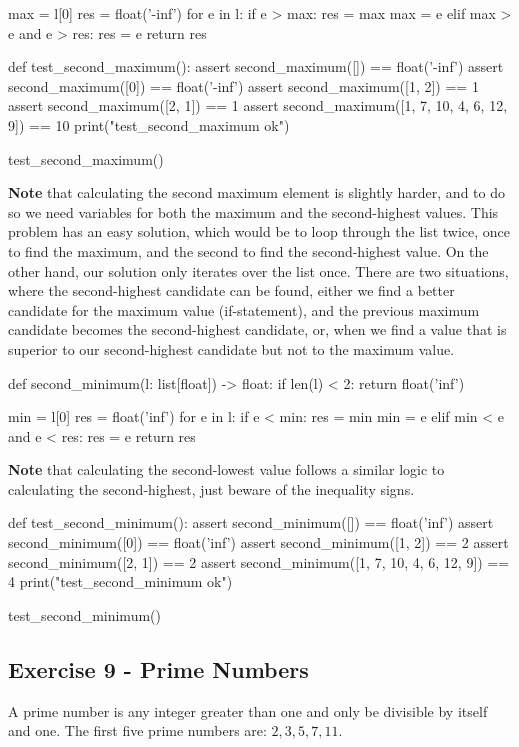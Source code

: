 \documentclass[12pt]{article}
\begin{document}
\begin{enumerate}[a)]
\begin{pythonlst}
  max = l[0]
  res = float('-inf')
  for e in l:
    if e > max:
      res = max
      max = e
    elif max > e and e > res:
      res = e
  return res

def test_second_maximum():
  assert second_maximum([]) == float('-inf')
  assert second_maximum([0]) == float('-inf')
  assert second_maximum([1, 2]) == 1
  assert second_maximum([2, 1]) == 1
  assert second_maximum([1, 7, 10, 4, 6, 12, 9]) == 10
  print("test_second_maximum ok")

test_second_maximum()
\end{pythonlst}
\textbf{Note} that calculating the second maximum element is slightly harder,
and to do so we need variables for both the maximum and the second-highest values.
This problem has an easy solution, which would be to loop through the list twice, 
once to find the maximum, and the second to find the second-highest value. On 
the other hand, our solution only iterates over the list once. There are two
situations, where the second-highest candidate can be found, either we find a 
better candidate for the maximum value (if-statement), and the previous maximum
candidate becomes the second-highest candidate, or, when we find a value that
is superior to our second-highest candidate but not to the maximum value.

\begin{pythonlst}
def second_minimum(l: list[float]) -> float:
  if len(l) < 2:
    return float('inf')
  
  min = l[0]
  res = float('inf')
  for e in l:
    if e < min:
      res = min
      min = e
    elif min < e and e < res:
      res = e
  return res
\end{pythonlst}
\textbf{Note} that calculating the second-lowest value follows a similar logic
to calculating the second-highest, just beware of the inequality signs.
\newpage
\begin{pythonlst}
def test_second_minimum():
  assert second_minimum([]) == float('inf')
  assert second_minimum([0]) == float('inf')
  assert second_minimum([1, 2]) == 2
  assert second_minimum([2, 1]) == 2
  assert second_minimum([1, 7, 10, 4, 6, 12, 9]) == 4
  print("test_second_minimum ok")

test_second_minimum()
\end{pythonlst}
\end{enumerate}

\subsection*{Exercise 9 - Prime Numbers}
A prime number is any integer greater than one and only be divisible by itself 
and one. The first five prime numbers are: $2, 3, 5, 7, 11$.
\end{document}

